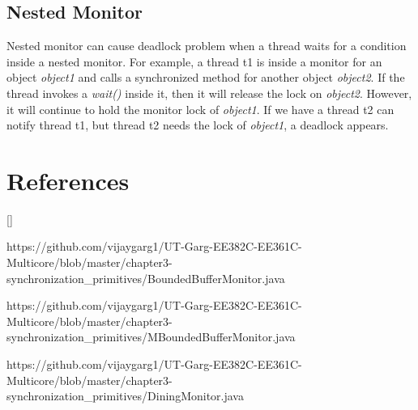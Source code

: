 \documentclass[twoside]{article}
\def\beginrefs{\begin{list}%
        {[\arabic{equation}]}{\usecounter{equation}
         \setlength{\leftmargin}{2.0truecm}\setlength{\labelsep}{0.4truecm}%
         \setlength{\labelwidth}{1.6truecm}}}
\def\endrefs{\end{list}}
\def\bibentry#1{\item[\hbox{[#1]}]}
\begin{document}
\subsection{Nested Monitor}
Nested monitor can cause deadlock problem when a thread waits for a condition inside a nested monitor. For example, a thread t1 is inside a monitor for an object \textit{object1} and calls a synchronized method for another object \textit{object2}. If the thread invokes a \textit{wait()} inside it, then it will release the lock on \textit{object2}. However, it will continue to hold the monitor lock of \textit{object1}. If we have a thread t2 can notify thread t1, but thread t2 needs the lock of \textit{object1}, a deadlock appears. 

\section*{References}
\beginrefs
\bibentry{1} https://github.com/vijaygarg1/UT-Garg-EE382C-EE361C-Multicore/blob/master/chapter3-
\\synchronization\_primitives/BoundedBufferMonitor.java
\bibentry{2} https://github.com/vijaygarg1/UT-Garg-EE382C-EE361C-Multicore/blob/master/chapter3-
\\synchronization\_primitives/MBoundedBufferMonitor.java
\bibentry{3} https://github.com/vijaygarg1/UT-Garg-EE382C-EE361C-Multicore/blob/master/chapter3-
\\synchronization\_primitives/DiningMonitor.java
\endrefs
\end{document}
